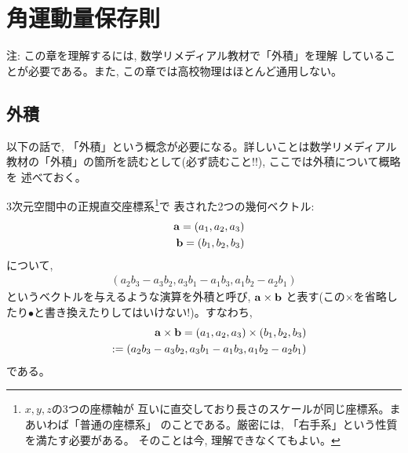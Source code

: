 \chapter{角運動量保存則}

注: この章を理解するには, 数学リメディアル教材で「外積」を理解
していることが必要である。また, この章では高校物理はほとんど通用しない。\mv

\section{外積}

以下の話で, 「外積」という概念が必要になる。詳しいことは数学リメディアル
教材の「外積」の箇所を読むとして(必ず読むこと!!), ここでは外積について概略を
述べておく。

3次元空間中の正規直交座標系\footnote{$x, y, z$の3つの座標軸が
互いに直交しており長さのスケールが同じ座標系。まあいわば「普通の座標系」
のことである。厳密には, 「右手系」という性質を満たす必要がある。
そのことは今, 理解できなくてもよい。}で
表された2つの幾何ベクトル:
\begin{eqnarray}
&&{\bf a}=(a_1, a_2, a_3)\\
&&{\bf b}=(b_1, b_2, b_3)
\end{eqnarray}
について, 
\begin{eqnarray}
(a_2b_3-a_3b_2, a_3b_1-a_1b_3, a_1b_2-a_2b_1)
\end{eqnarray}
というベクトルを与えるような演算を外積と呼び, ${\bf a}\times{\bf b}$
と表す(この$\times$を省略したり$\bullet$と書き換えたりしてはいけない!)。すなわち, 
\begin{eqnarray}
&&{\bf a}\times{\bf b}=(a_1, a_2, a_3)\times(b_1, b_2, b_3)\nonumber\\
&&:=(a_2b_3-a_3b_2, a_3b_1-a_1b_3, a_1b_2-a_2b_1)
\label{eq:vectprod}\end{eqnarray}
である。

